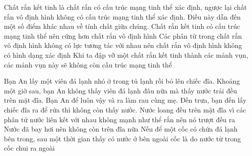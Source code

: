 \begin{ex} 
	Chất rắn kết tinh là chất rắn có cấu trúc mạng tinh thể xác định, ngược lại chất rắn vô định hình không có cấu trúc mạng tinh thể xác định. Điều này dẫn đến một số điểm khác nhau về tính chất giữa chúng.
	{Chất rắn kết tinh có cấu trúc mạng tinh thể nên cứng hơn chất rắn vô định hình}
	{Các phân tử trong chất rắn vô định hình không có lực tương tác với nhau nên chất rắn vô định hình không có hình dạng xác định}
	{Khi ta đập vỡ một chất rắn kết tinh thành các mảnh vụn, các mảnh vụn này sẽ không còn cấu trúc mạng tinh thể}
\end{ex}
\begin{ex}
	Bạn An lấy một viên đá lạnh nhỏ ở trong tủ lạnh rồi bỏ lên chiếc đĩa. Khoảng một giờ sau, bạn An không thấy viên đá lạnh đâu nữa mà thấy nước trải đều trên mặt đĩa. Bạn An để luôn vậy và ra làm rau cùng mẹ. Đến trưa, bạn đến lấy chiếc đĩa ra để rửa thì không còn thấy nước.
	{\True Nước loang đều trên mặt đĩa vì các phân tử nước liên kết với nhau không mạnh như thể rắn nên nó trượt đều ra}
	{\True Nước đã bay hơi nên không còn trên đĩa nữa}
	{Nếu để một cốc có chứa đá lạnh bên trong, sau một thời gian thấy có nước ở bên ngoài cốc là do nước từ trong cốc chui ra ngoài}
	
	\end{ex}
